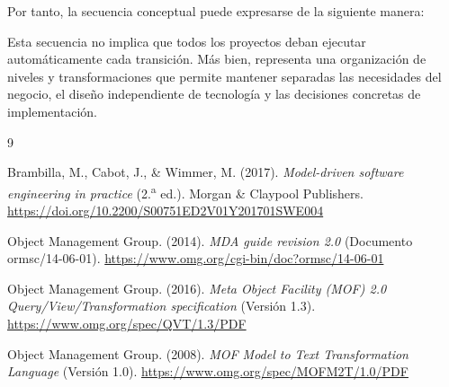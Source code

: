 \documentclass[12pt,a4paper]{article}
\begin{document}
Por tanto, la secuencia conceptual puede expresarse de la siguiente manera:

\begin{center}
\end{center}

Esta secuencia no implica que todos los proyectos deban ejecutar automáticamente cada transición. Más bien, representa una organización de niveles y transformaciones que permite mantener separadas las necesidades del negocio, el diseño independiente de tecnología y las decisiones concretas de implementación.

\begin{thebibliography}{9}

Brambilla, M., Cabot, J., \& Wimmer, M. (2017).
\textit{Model-driven software engineering in practice} (2.\textsuperscript{a} ed.).
Morgan \& Claypool Publishers.
\url{https://doi.org/10.2200/S00751ED2V01Y201701SWE004}

Object Management Group. (2014).
\textit{MDA guide revision 2.0} (Documento ormsc/14-06-01).
\url{https://www.omg.org/cgi-bin/doc?ormsc/14-06-01}

Object Management Group. (2016).
\textit{Meta Object Facility (MOF) 2.0 Query/View/Transformation specification} (Versión 1.3).
\url{https://www.omg.org/spec/QVT/1.3/PDF}

Object Management Group. (2008).
\textit{MOF Model to Text Transformation Language} (Versión 1.0).
\url{https://www.omg.org/spec/MOFM2T/1.0/PDF}

\end{thebibliography}
\end{document}
